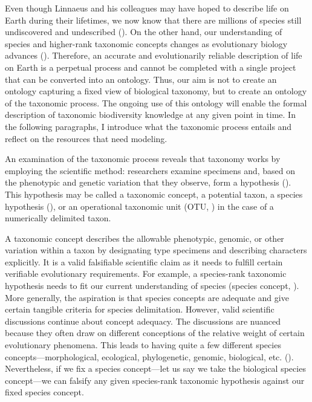 Even though Linnaeus and his colleagues may have hoped to describe life on Earth during their lifetimes, we now know that there are millions of species still undiscovered and undescribed (\cite{trontelj_cryptic_2009}). On the other hand, our understanding of species and higher-rank taxonomic concepts changes as evolutionary biology advances (\cite{mallet_species_2001}). Therefore, an accurate and evolutionarily reliable description of life on Earth is a perpetual process and cannot be completed with a single project that can be converted into an ontology. Thus, our aim is not to create an ontology capturing a fixed view of biological taxonomy, but to create an ontology of the taxonomic process. The ongoing use of this ontology will enable the formal description of taxonomic biodiversity knowledge at any given point in time. In the following paragraphs, I introduce what the taxonomic process entails and reflect on the resources that need modeling.

An examination of the taxonomic process reveals that taxonomy works by employing the scientific method: researchers examine specimens and, based on the phenotypic and genetic variation that they observe, form a hypothesis (\cite{deans_time_2012}). This hypothesis may be called a taxonomic concept, a potential taxon, a species hypothesis (\cite{berendsohn_concept_1995}), or an operational taxonomic unit (OTU, \cite{sokal_principles_1963}) in the case of a numerically delimited taxon.

A taxonomic concept describes the allowable phenotypic, genomic, or other variation within a taxon by designating type specimens and describing characters explicitly. It is a valid falsifiable scientific claim as it needs to fulfill certain verifiable evolutionary requirements. For example, a species-rank taxonomic hypothesis needs to fit our current understanding of species (species concept,  \cite{mallet_species_2001}). More generally, the aspiration is that species concepts are adequate and give certain tangible criteria for species delimitation. However, valid scientific discussions continue about concept adequacy. The discussions are nuanced because they often draw on different conceptions of the relative weight of certain evolutionary phenomena. This leads to having quite a few different species concepts---morphological, ecological, phylogenetic, genomic, biological, etc. (\cite{mallet_species_2001}). Nevertheless, if we fix a species concept---let us say we take the biological species concept---we can falsify any given species-rank taxonomic hypothesis against our fixed species concept.

